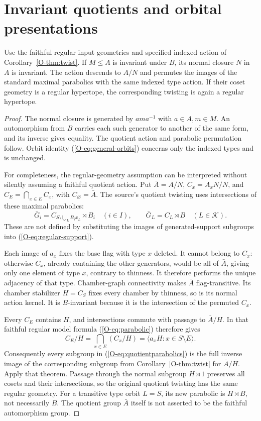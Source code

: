 \section{Invariant quotients and orbital presentations}
\begin{lemma}[Quotients]\label{O-lem:quotient}
Use the faithful regular input geometries and specified indexed action of Corollary~\ref{O-thm:twist}. If $M\leq A$ is invariant under $B$, its normal closure $N$ in $A$ is invariant. The action descends to $A/N$ and permutes the images of the standard maximal parabolics with the same indexed type action. If their coset geometry is a regular hypertope, the corresponding twisting is again a regular hypertope.
\end{lemma}
\begin{proof}
The normal closure is generated by $a m a^{-1}$ with $a\in A,m\in M$. An automorphism from $B$ carries each such generator to another of the same form, and its inverse gives equality. The quotient action and parabolic permutation follow. Orbit identity (\ref{O-eq:general-orbits}) concerns only the indexed types and is unchanged.

For completeness, the regular-geometry assumption can be interpreted without silently assuming a faithful quotient action. Put $\bar A=A/N$, $C_x=A_xN/N$, and $C_E=\bigcap_{x\in E}C_x$, with $C_\varnothing=\bar A$. The source's quotient twisting uses intersections of these maximal parabolics:
\begin{equation}\label{O-eq:quotientparabolics}
\bar G_i=C_{S\setminus\bigcup_L B_ix_L}\rtimes B_i\quad(i\in I),
\qquad \bar G_L=C_L\rtimes B\quad(L\in\mathcal K).
\end{equation}
These are not defined by substituting the images of generated-support subgroups into (\ref{O-eq:regular-support}).

Each image of $a_x$ fixes the base flag with type $x$ deleted. It cannot belong to $C_x$: otherwise $C_x$, already containing the other generators, would be all of $\bar A$, giving only one element of type $x$, contrary to thinness. It therefore performs the unique adjacency of that type. Chamber-graph connectivity makes $\bar A$ flag-transitive. Its chamber stabilizer $H=C_S$ fixes every chamber by thinness, so is its normal action kernel. It is $B$-invariant because it is the intersection of the permuted $C_x$.

Every $C_E$ contains $H$, and intersections commute with passage to $\bar A/H$. In that faithful regular model formula (\ref{O-eq:parabolic}) therefore gives
\[
C_E/H=\bigcap_{x\in E}(C_x/H)
=\langle a_xH:x\in S\setminus E\rangle.
\]
Consequently every subgroup in (\ref{O-eq:quotientparabolics}) is the full inverse image of the corresponding subgroup from Corollary~\ref{O-thm:twist} for $\bar A/H$. Apply that theorem. Passage through the normal subgroup $H\rtimes1$ preserves all cosets and their intersections, so the original quotient twisting has the same regular geometry. For a transitive type orbit $L=S$, its new parabolic is $H\rtimes B$, not necessarily $B$. The quotient group $\bar A$ itself is not asserted to be the faithful automorphism group.
\end{proof}

